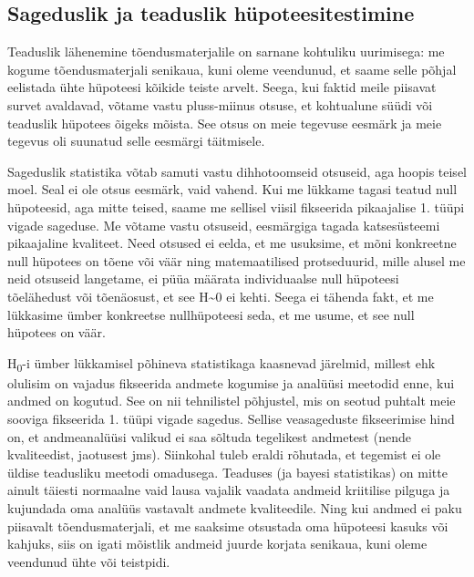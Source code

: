 \documentclass[]{book}
\begin{document}
\hypertarget{sageduslik-ja-teaduslik-hupoteesitestimine}{%
\subsection*{Sageduslik ja teaduslik hüpoteesitestimine}\label{sageduslik-ja-teaduslik-hupoteesitestimine}}

Teaduslik lähenemine tõendusmaterjalile on sarnane kohtuliku uurimisega: me kogume tõendusmaterjali senikaua, kuni oleme veendunud, et saame selle põhjal eelistada ühte hüpoteesi kõikide teiste arvelt. Seega, kui faktid meile piisavat survet avaldavad, võtame vastu pluss-miinus otsuse, et kohtualune süüdi või teaduslik hüpotees õigeks mõista. See otsus on meie tegevuse eesmärk ja meie tegevus oli suunatud selle eesmärgi täitmisele.

Sageduslik statistika võtab samuti vastu dihhotoomseid otsuseid, aga hoopis teisel moel. Seal ei ole otsus eesmärk, vaid vahend. Kui me lükkame tagasi teatud null hüpoteesid, aga mitte teised, saame me sellisel viisil fikseerida pikaajalise 1. tüüpi vigade sageduse. Me võtame vastu otsuseid, eesmärgiga tagada katsesüsteemi pikaajaline kvaliteet. Need otsused ei eelda, et me usuksime, et mõni konkreetne null hüpotees on tõene või väär ning matemaatilised protseduurid, mille alusel me neid otsuseid langetame, ei püüa määrata individuaalse null hüpoteesi tõelähedust või tõenäosust, et see H\textasciitilde{}0 ei kehti. Seega ei tähenda fakt, et me lükkasime ümber konkreetse nullhüpoteesi seda, et me usume, et see null hüpotees on väär.

H\textsubscript{0}-i ümber lükkamisel põhineva statistikaga kaasnevad järelmid, millest ehk olulisim on vajadus fikseerida andmete kogumise ja analüüsi meetodid enne, kui andmed on kogutud. See on nii tehnilistel põhjustel, mis on seotud puhtalt meie sooviga fikseerida 1. tüüpi vigade sagedus. Sellise veasageduste fikseerimise hind on, et andmeanalüüsi valikud ei saa sõltuda tegelikest andmetest (nende kvaliteedist, jaotusest jms). Siinkohal tuleb eraldi rõhutada, et tegemist ei ole üldise teadusliku meetodi omadusega. Teaduses (ja bayesi statistikas) on mitte ainult täiesti normaalne vaid lausa vajalik vaadata andmeid kriitilise pilguga ja kujundada oma analüüs vastavalt andmete kvaliteedile. Ning kui andmed ei paku piisavalt tõendusmaterjali, et me saaksime otsustada oma hüpoteesi kasuks või kahjuks, siis on igati mõistlik andmeid juurde korjata senikaua, kuni oleme veendunud ühte või teistpidi.
\end{document}
